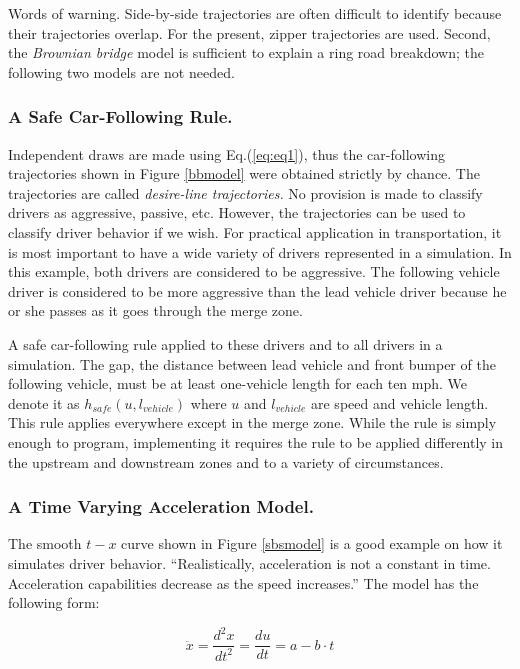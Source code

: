 \documentclass[Proceedings]{ascelike}
\begin{document}
Words of warning. Side-by-side trajectories are often difficult to identify because their trajectories overlap. For the present, zipper trajectories are   used. Second, the \emph{Brownian bridge} model is sufficient to explain a ring road breakdown; the following two models are not needed.



\subsubsection{A Safe Car-Following Rule.} 

Independent draws are made using Eq.(\ref{eq:eq1}), thus the car-following trajectories shown in Figure \ref{bbmodel} were obtained strictly by chance. The trajectories are called \emph{desire-line trajectories.} No provision is made to classify drivers as aggressive, passive,  etc. However, the trajectories can be used to classify driver behavior if we wish. For practical application in transportation, it is  most important to have a wide variety of drivers represented in a simulation. In this example, both  drivers  are considered  to be aggressive. The following vehicle driver  is considered to be more aggressive than the lead vehicle driver because he or she passes as it goes through  the merge zone.  

A safe car-following rule applied to these drivers and to all drivers in a simulation. The gap, the distance between lead vehicle and front bumper of the following vehicle, must be at least one-vehicle length for each ten mph. We denote it as $h_{safe}(u, l_{vehicle})$ where $u$ and $l_{vehicle}$ are speed and vehicle length. This rule applies everywhere except in the  merge zone. While the rule is simply enough to program, implementing it requires the rule to be applied differently in the upstream and downstream zones and to a variety of circumstances. 

\subsubsection{A Time Varying Acceleration Model.}

The smooth $t-x$ curve shown in Figure \ref{sbsmodel} is a good example on how it simulates driver behavior.  ``Realistically, acceleration is not a constant in time. Acceleration capabilities decrease as the speed increases.\cite{LiliBook}''  The model has the following form:

\begin {equation}
 \ddot{x} = \frac{d^2x}{dt^2} = \frac{du}{dt} =  a - b \cdot t \label{eq:eq3}
\end{equation}
\end{document}

